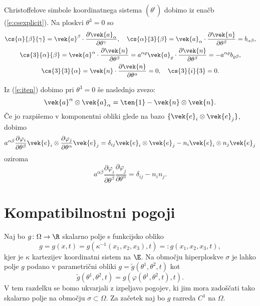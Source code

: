 Christoffelove simbole koordinatnega sistema $(\theta^i)$ dobimo iz
enačb (\ref{e:csexplicit}). Na ploskvi $\theta^3=0$ so
\begin{gather}
	\cs{\alpha}{\beta}{\gamma}=\vek{a}^{\beta}\cdot\frac{\partial\vek{a}_{\alpha}}{\partial\theta^{\gamma}},\quad
	\cs{\alpha}{3}{\beta}=\vek{a}_{\alpha}\cdot\frac{\partial\vek{n}}{\partial\theta^{\beta}}=b_{\alpha\beta},\nonumber\\
	\cs{3}{\alpha}{\beta}=\vek{a}^{\alpha}\cdot\frac{\partial\vek{n}}{\partial\theta^{\beta}}
	=a^{\alpha\varrho}\vek{a}_{\varrho}\cdot\frac{\partial\vek{n}}{\partial\theta^{\beta}}
	=-a^{\alpha\varrho}b_{\varrho\beta},\nonumber\\
	\cs{3}{3}{\alpha}=\vek{n}\cdot\frac{\partial\vek{n}}{\partial\theta^{\alpha}}=0,\quad
	\cs{3}{i}{3}=0. \label{e:csnasi}
\end{gather}

Iz (\ref{e:iten}) dobimo pri $\theta^3=0$ še naslednjo zvezo:
\[ \vek{a}^{\alpha}\otimes\vek{a}_{\alpha}=\ten{1}-\vek{n}\otimes\vek{n}. \]
Če jo razpišemo v komponentni obliki glede na bazo $\{\vek{e}_i\otimes\vek{e}_j\}$, dobimo
\[
	a^{\alpha\beta}\frac{\partial\varphi_i}{\partial\theta^{\beta}}\vek{e}_i
	\otimes\frac{\partial\varphi_j}{\partial\theta^{\alpha}}\vek{e}_j=
	\delta_{ij}\vek{e}_i\otimes\vek{e}_j-n_i\vek{e}_i\otimes n_j\vek{e}_j
\]
oziroma
\begin{equation} \label{e:mucenje}
	a^{\alpha\beta}\frac{\partial\varphi_i}{\partial\theta^{\beta}}
	\frac{\partial\varphi_j}{\partial\theta^{\alpha}}=\delta_{ij}-n_i n_j.
\end{equation}


\section{Kompatibilnostni pogoji}


Naj bo $g\colon\Omega\to\R$ skalarno polje s funkcijsko obliko
\[ g=g(x,t)=g(\kappa^{-1}(x_1,x_2,x_3),t)=:g(x_1,x_2,x_3,t), \]
kjer je $\kappa$ kartezijev koordinatni sistem na $\E$. Na območju hiperploskve $\sigma$
je lahko polje $g$ podano v parametrični obliki $g=\tilde{g}(\theta^1,\theta^2,t)$ kot
\begin{equation} \label{e:totog}
	\tilde{g}(\theta^1,\theta^2,t)=g(\varphi(\theta^1,\theta^2,t),t).
\end{equation}
V tem razdelku se bomo ukvarjali
z izpeljavo pogojev, ki jim mora zadoščati tako skalarno polje na območju $\sigma\subset\Omega$.
Za začetek naj bo $g$ razreda $C^1$ na $\Omega$.

